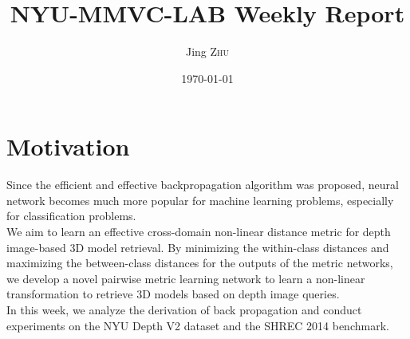 \documentclass{article}
\title{NYU-MMVC-LAB Weekly Report} %
\author{Jing \textsc{Zhu}} %
\date{\today} %
\begin{document}
\maketitle %




\section{Motivation}
Since the efficient and effective backpropagation algorithm was proposed, neural network becomes much more popular for machine learning problems, especially for classification problems.  \\   

We aim to learn an effective cross-domain non-linear distance metric for depth image-based 3D model retrieval. By minimizing the within-class distances and maximizing the between-class distances for the outputs of the metric networks, we develop a novel pairwise metric learning network to learn a non-linear transformation to retrieve 3D models based on depth image queries.\\

In this week, we analyze the derivation of back propagation and conduct experiments on the NYU Depth V2 dataset and the SHREC 2014 benchmark.
\end{document}
